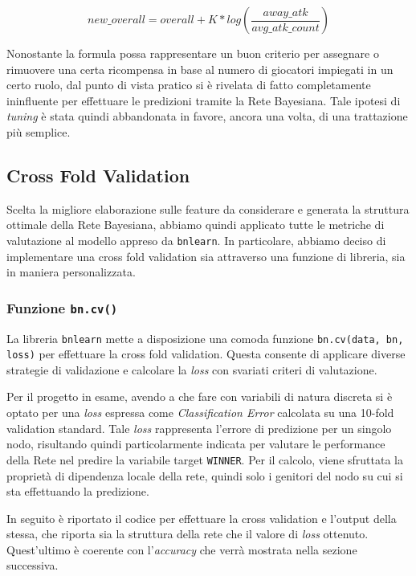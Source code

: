 \documentclass[hidelinks, 12pt]{article}
\begin{document}
$$
new\_overall = overall + K*log(\frac{away\_atk}{avg\_atk\_count})
$$

Nonostante la formula possa rappresentare un buon criterio per assegnare o rimuovere una certa ricompensa in base al numero di giocatori impiegati in un certo ruolo, dal punto di vista pratico si è rivelata di fatto completamente ininfluente per effettuare le predizioni tramite la Rete Bayesiana. Tale ipotesi di \textit{tuning} è stata quindi abbandonata in favore, ancora una volta, di una trattazione più semplice.



\subsection{Cross Fold Validation}
\label{sec:perf-cross-fold}

Scelta la migliore elaborazione sulle feature da considerare e generata la struttura ottimale della Rete Bayesiana, abbiamo quindi applicato tutte le metriche di valutazione al modello appreso da \texttt{bnlearn}. In particolare, abbiamo deciso di implementare una cross fold validation sia attraverso una funzione di libreria, sia in maniera personalizzata.


\subsubsection{Funzione \texttt{bn.cv()}}

La libreria \texttt{bnlearn} mette a disposizione una comoda funzione \texttt{bn.cv(data, bn, loss)} per effettuare la cross fold validation. Questa consente di applicare diverse strategie di validazione e calcolare la \textit{loss} con svariati criteri di valutazione.

Per il progetto in esame, avendo a che fare con variabili di natura discreta si è optato per una \textit{loss} espressa come \textit{Classification Error} calcolata su una 10-fold validation standard. Tale \textit{loss} rappresenta l'errore di predizione per un singolo nodo, risultando quindi particolarmente indicata per valutare le performance della Rete nel predire la variabile target \texttt{WINNER}. Per il calcolo, viene sfruttata la proprietà di dipendenza locale della rete, quindi solo i genitori del nodo su cui si sta effettuando la predizione.

In seguito è riportato il codice per effettuare la cross validation e l'output della stessa, che riporta sia la struttura della rete che il valore di \textit{loss} ottenuto. Quest'ultimo è coerente con l'\textit{accuracy} che verrà mostrata nella sezione successiva.
\end{document}
